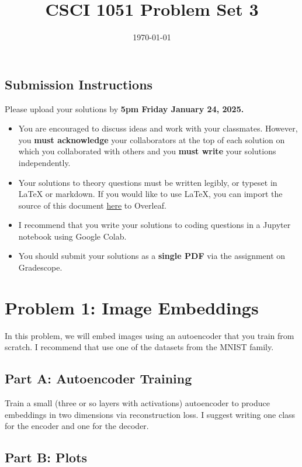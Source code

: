 \documentclass{article}
\title{CSCI 1051 Problem Set 3}
\author{} %
\date{\today}
\begin{document}
\maketitle

\subsection*{Submission Instructions}

Please upload your solutions by
\textbf{5pm Friday January 24, 2025.}
\begin{itemize}
\item You are encouraged to discuss ideas
and work with your classmates. However, you
\textbf{must acknowledge} your collaborators
at the top of each solution on which
you collaborated with others 
and you \textbf{must write} your solutions
independently.
\item Your solutions to theory questions must
be written legibly, or typeset in LaTeX or markdown.
If you would like to use LaTeX, you can import the source of this document 
\href{https://www.rtealwitter.com/deeplearning/psets/pset2.tex}{here}
to Overleaf.
\item I recommend that you write your solutions to coding questions in a Jupyter notebook using Google Colab.
\item You should submit your solutions as a \textbf{single PDF} via the assignment on Gradescope.
\end{itemize}

\newpage \section*{Problem 1: Image Embeddings}

In this problem, we will embed images using an autoencoder that you train from scratch.
I recommend that use one of the datasets from the MNIST family.

\subsection*{Part A: Autoencoder Training}

Train a small (three or so layers with activations) autoencoder to produce embeddings in two dimensions via reconstruction loss.
I suggest writing one class for the encoder and one for the decoder.

\subsection*{Part B: Plots}
\end{document}
